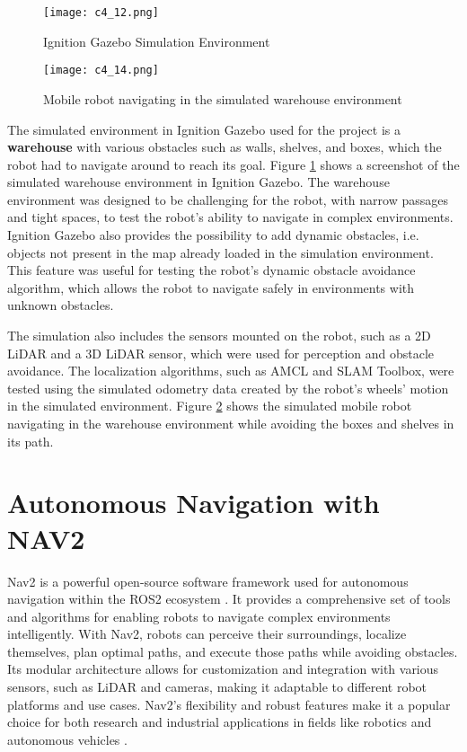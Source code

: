 \begin{figure}[t]
    \centering
    \texttt{[image: c4\_12.png]}
    \caption{Ignition Gazebo Simulation Environment}
    \label{fig:ignition}
\end{figure}

\begin{figure}[t]
    \centering
    \texttt{[image: c4\_14.png]}
    \caption{Mobile robot navigating in the simulated warehouse environment}
    \label{fig:warehousenav2}
\end{figure}

The simulated environment in Ignition Gazebo used for the project is a \textbf{warehouse}
with various obstacles such as walls, shelves, and boxes, which the robot had to navigate around to reach its goal.
Figure \ref{fig:ignition} shows a screenshot of the simulated warehouse environment in Ignition Gazebo.
The warehouse environment was designed to be challenging
for the robot, with narrow passages and tight spaces, to test the robot's ability to navigate in complex environments.
Ignition Gazebo also provides the possibility to add dynamic obstacles, i.e. objects not present in the map
already loaded in the simulation environment. This feature was useful for testing the robot's dynamic obstacle avoidance
algorithm, which allows the robot to navigate safely in environments with unknown obstacles.

The simulation also includes the sensors mounted on the robot, such as a 2D LiDAR and a 3D LiDAR sensor, which were used
for perception and obstacle avoidance. The localization algorithms, such as AMCL and SLAM Toolbox,
were tested using the simulated odometry data created by the robot's wheels' motion in the simulated environment. Figure 
\ref{fig:warehousenav2} shows the simulated mobile robot navigating in the warehouse environment
while avoiding the boxes and shelves in its path.

\section{Autonomous Navigation with NAV2}

Nav2 is a powerful open-source software framework used for autonomous navigation within the ROS2 ecosystem
\cite{macenski2020nav2}.
It provides a comprehensive set of tools and algorithms for enabling robots to navigate complex environments intelligently.
With Nav2, robots can perceive their surroundings, localize themselves, plan optimal paths, and execute 
those paths while avoiding obstacles. Its modular architecture allows for customization and integration with various sensors,
such as LiDAR and cameras, making it adaptable to different robot platforms and use cases. 
Nav2's flexibility and robust features make it a popular choice for both research and industrial applications 
in fields like robotics and autonomous vehicles
\cite{macenski2023survey}.

